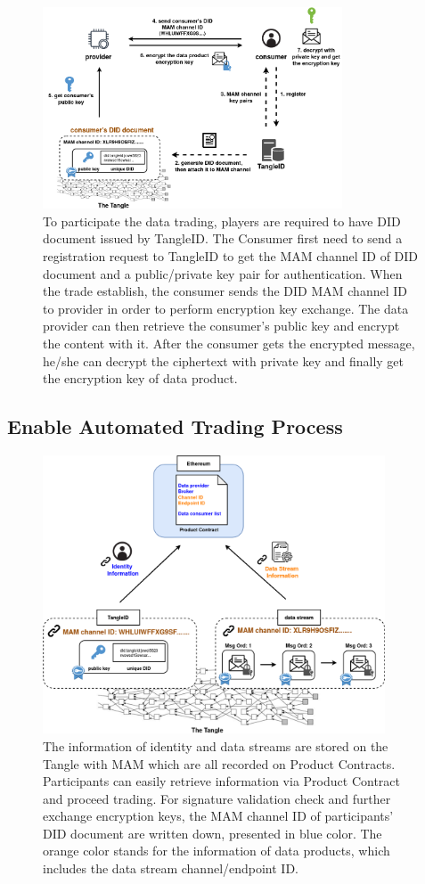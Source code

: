 \documentclass[conference]{IEEEtran}
\begin{document}
\begin{figure}[h]
    \centering
    \includegraphics[width=3.5in]{TangleID}
    \caption{To participate the data trading, players are required to have DID document issued by TangleID. The Consumer first need to send a registration request to TangleID to get the MAM channel ID of DID document and a public/private key pair for authentication. When the trade establish, the consumer sends the DID MAM channel ID to provider in order to perform encryption key exchange. The data provider can then retrieve the consumer's public key and encrypt the content with it. After the consumer gets the encrypted message, he/she can decrypt the ciphertext with private key and finally get the encryption key of data product.}
    \label{fig:TangleID}
\end{figure}


\subsection{Enable Automated Trading Process}
\begin{figure}[t]
    \centering
    \includegraphics[width=4in]{smart_contract_mam}
    \caption{The information of identity and data streams are stored on the Tangle with MAM which are all recorded on Product Contracts. Participants can easily retrieve information via Product Contract and proceed trading. For signature validation check and further exchange encryption keys, the MAM channel ID of participants' DID document are written down, presented in blue color. The orange color stands for the information of data products, which includes the data stream channel/endpoint ID.}
    \label{fig:smart_contract_mam}
\end{figure}
\end{document}
